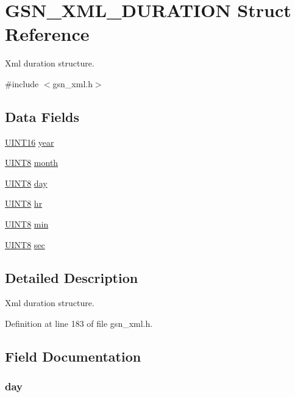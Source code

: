\hypertarget{a00433}{
\section{GSN\_\-XML\_\-DURATION Struct Reference}
\label{a00433}
}


Xml duration structure.  




{\ttfamily \#include $<$gsn\_\-xml.h$>$}

\subsection*{Data Fields}
\begin{DoxyCompactItemize}
\item 
\hyperlink{a00660_ga09f1a1fb2293e33483cc8d44aefb1eb1}{UINT16} \hyperlink{a00433_a15cf81be0bc3b33c7cc971ed1a815c74}{year}
\item 
\hyperlink{a00660_gab27e9918b538ce9d8ca692479b375b6a}{UINT8} \hyperlink{a00433_a9a7060ed27a8fc1c0a801ca792fbc955}{month}
\item 
\hyperlink{a00660_gab27e9918b538ce9d8ca692479b375b6a}{UINT8} \hyperlink{a00433_a2121477f11d8a58cddd6a8c0e9717476}{day}
\item 
\hyperlink{a00660_gab27e9918b538ce9d8ca692479b375b6a}{UINT8} \hyperlink{a00433_a5dff479f0f1395e93a28dd0c7b1335b2}{hr}
\item 
\hyperlink{a00660_gab27e9918b538ce9d8ca692479b375b6a}{UINT8} \hyperlink{a00433_afcd3b3e11f0b83ec71d50a827e42d9db}{min}
\item 
\hyperlink{a00660_gab27e9918b538ce9d8ca692479b375b6a}{UINT8} \hyperlink{a00433_a2edad25d34a288a33b77f09dfc71faa5}{sec}
\end{DoxyCompactItemize}


\subsection{Detailed Description}
Xml duration structure. 

Definition at line 183 of file gsn\_\-xml.h.



\subsection{Field Documentation}
\hypertarget{a00433_a2121477f11d8a58cddd6a8c0e9717476}{
\subsubsection[{day}]{ {\bf day}}}
\label{a00433_a2121477f11d8a58cddd6a8c0e9717476}


